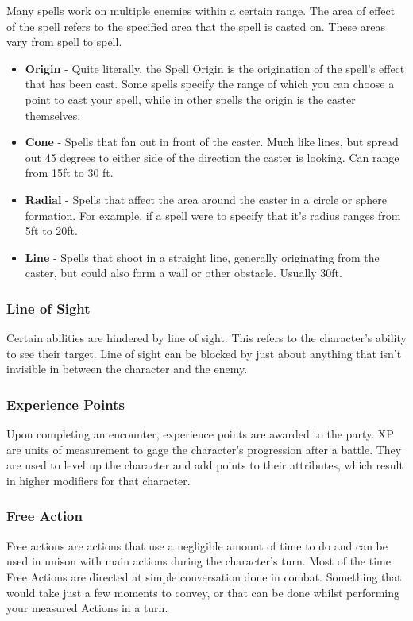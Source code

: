 \documentclass[12pt,a4paper]{report}
\begin{document}
				Many spells work on multiple enemies within a certain range. The area of effect of the spell refers to the specified area that the spell is casted on. These areas vary from spell to spell.
				\begin{itemize}
					\item \textbf{Origin} - Quite literally, the Spell Origin is the origination of the spell's effect that has been cast. Some spells specify the range of which you can choose a point to cast your spell, while in other spells the origin is the caster themselves.
					\item \textbf{Cone} - Spells that fan out in front of the caster. Much like lines, but spread out 45 degrees to either side of the direction the caster is looking. Can range from 15ft to 30 ft.
					\item \textbf{Radial} - Spells that affect the area around the caster in a circle or sphere formation. For example, if a spell were to specify that it's radius ranges from 5ft to 20ft.
					\item \textbf{Line} - Spells that shoot in a straight line, generally originating from the caster, but could also form a wall or other obstacle. Usually 30ft.
				\end{itemize}	
				
			\subsubsection{Line of Sight}
				Certain abilities are hindered by line of sight. This refers to the character's ability to see their target. Line of sight can be blocked by just about anything that isn't invisible in between the character and the enemy.
			\subsubsection{Experience Points}
				Upon completing an encounter, experience points are awarded to the party. XP are units of measurement to gage the character's progression after a battle. They are used to level up the character and add points to their attributes, which result in higher modifiers for that character.
			\subsubsection{Free Action}
				Free actions are actions that use a negligible amount of time to do and can be used in unison with main actions during the character's turn. Most of the time Free Actions are directed at simple conversation done in combat. Something that would take just a few moments to convey, or that can be done whilst performing your measured Actions in a turn.
\end{document}
